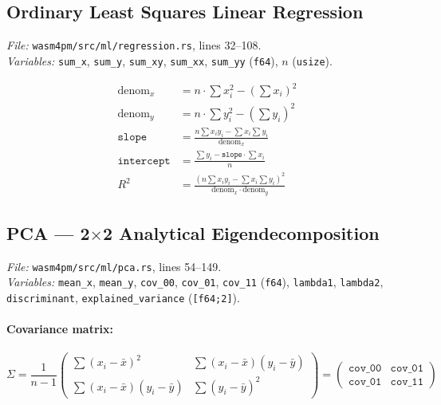 \documentclass[11pt,a4paper]{article}
\begin{document}
\subsection{Ordinary Least Squares Linear Regression}
\textit{File:} \texttt{wasm4pm/src/ml/regression.rs}, lines 32--108.\\
\textit{Variables:} \texttt{sum\_x}, \texttt{sum\_y}, \texttt{sum\_xy}, \texttt{sum\_xx}, \texttt{sum\_yy} (\texttt{f64}), $n$ (\texttt{usize}).

\begin{align}
  \text{denom}_x &= n\cdot\sum x_i^2 - \left(\sum x_i\right)^2 \\[4pt]
  \text{denom}_y &= n\cdot\sum y_i^2 - \left(\sum y_i\right)^2 \\[6pt]
  \texttt{slope} &= \frac{n\sum x_i y_i - \sum x_i \sum y_i}{\text{denom}_x} \\[6pt]
  \texttt{intercept} &= \frac{\sum y_i - \texttt{slope}\cdot\sum x_i}{n} \\[6pt]
  R^2 &= \frac{\left(n\sum x_i y_i - \sum x_i \sum y_i\right)^2}
              {\text{denom}_x \cdot \text{denom}_y}
\end{align}

\subsection{PCA — 2$\times$2 Analytical Eigendecomposition}
\textit{File:} \texttt{wasm4pm/src/ml/pca.rs}, lines 54--149.\\
\textit{Variables:} \texttt{mean\_x}, \texttt{mean\_y}, \texttt{cov\_00}, \texttt{cov\_01}, \texttt{cov\_11} (\texttt{f64}), \texttt{lambda1}, \texttt{lambda2}, \texttt{discriminant}, \texttt{explained\_variance} (\texttt{[f64;2]}).

\paragraph{Covariance matrix:}
\begin{equation}
  \Sigma = \frac{1}{n-1}
  \begin{pmatrix}
    \sum(x_i-\bar x)^2 & \sum(x_i-\bar x)(y_i-\bar y) \\
    \sum(x_i-\bar x)(y_i-\bar y) & \sum(y_i-\bar y)^2
  \end{pmatrix}
  =
  \begin{pmatrix}
    \texttt{cov\_00} & \texttt{cov\_01} \\
    \texttt{cov\_01} & \texttt{cov\_11}
  \end{pmatrix}
\end{equation}
\end{document}
